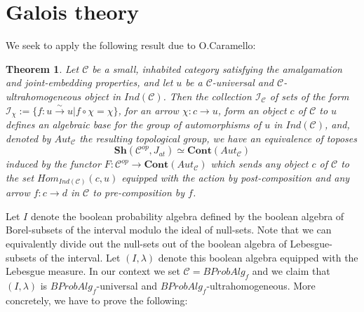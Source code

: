 \documentclass[a4paper,draft]{amsproc}
\theoremstyle{plain}
\newtheorem{theorem}{Theorem}[section]
\theoremstyle{definition}
\theoremstyle{remark}
\numberwithin{equation}{section}
\begin{document}
\section{Galois theory}
We seek to apply the following result due to O.Caramello:

\begin{theorem}\label{olivia}
Let $\mathcal{C}$ be a small, inhabited category satisfying the amalgamation and joint-embedding properties, and let $u$ be a $\mathcal{C}$-universal and $\mathcal{C}$-ultrahomogeneous object in $Ind(\mathcal{C})$. Then the collection $\mathcal{I}_{\mathcal{C}}$ of sets of the form $\mathcal{I}_{\chi}:=\{f:u\overset{\sim}{\rightarrow} u| f\circ \chi=\chi\} $, for an arrow $\chi:c\rightarrow u$, form an object $c$ of $\mathcal{C}$ to $u$ defines an algebraic base for the group of automorphisms of $u$ in $Ind(\mathcal{C})$, and, denoted by $Aut_\mathcal{C}$ the resulting topological group, we have an equivalence of toposes
\[\textbf{Sh}(\mathcal{C}^{op},J_{at})\simeq \textbf{Cont}(Aut_\mathcal{C}) \]
induced by the functor $F:\mathcal{C}^{op}\rightarrow \textbf{Cont}(Aut_{\mathcal{C}})$ which sends any object $c$ of $\mathcal{C}$ to the set $Hom_{Ind(\mathcal{C})}(c,u)$ equipped with the action by post-composition and any arrow $f:c\rightarrow d$ in $\mathcal{C}$ to pre-composition by $f$.
\end{theorem}

Let $I$ denote the boolean probability algebra defined by the boolean algebra of Borel-subsets of the interval modulo the ideal of null-sets. Note that we can equivalently divide out the null-sets out of the boolean algebra of Lebesgue-subsets of the interval. Let $(I, \lambda)$ denote this boolean algebra equipped with the Lebesgue measure. In our context we set $\mathcal{C}=BProbAlg_f$ and we claim that $(I, \lambda)$ is  $BProbAlg_f$-universal and $BProbAlg_f$-ultrahomogeneous. More concretely, we have to prove the following:
\end{document}
